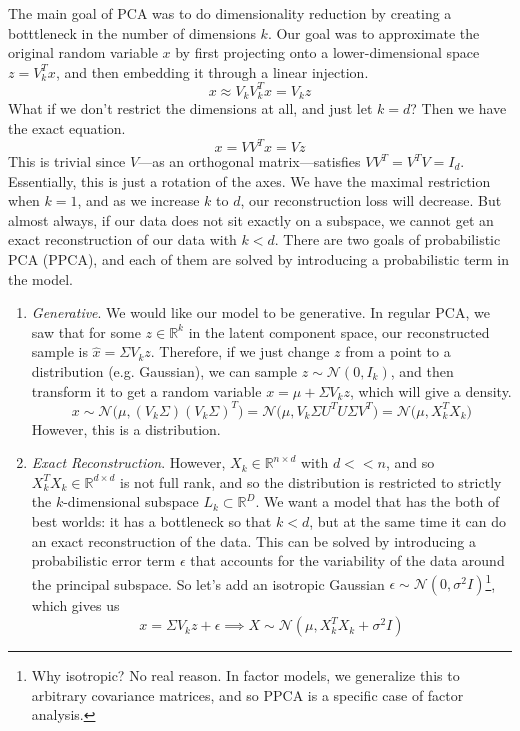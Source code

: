   The main goal of PCA was to do dimensionality reduction by creating a botttleneck in the number of dimensions $k$. Our goal was to approximate the original random variable $x$ by first projecting onto a lower-dimensional space $z = V_k^T x$, and then embedding it through a linear injection. 
  \begin{equation}
    x \approx V_k V_k^T x = V_k z 
  \end{equation} 
  What if we don't restrict the dimensions at all, and just let $k = d$? Then we have the exact equation. 
  \begin{equation}
    x = V V^T x = V z
  \end{equation}
  This is trivial since $V$---as an orthogonal matrix---satisfies $V V^T = V^T V = I_d$. Essentially, this is just a rotation of the axes. We have the maximal restriction when $k = 1$, and as we increase  $k$ to $d$, our reconstruction loss will decrease. But almost always, if our data does not sit exactly on a subspace, we cannot get an exact reconstruction of our data with $k < d$. There are two goals of probabilistic PCA (PPCA), and each of them are solved by introducing a probabilistic term in the model. \cite{1999tipping} 
  \begin{enumerate}
    \item \textit{Generative}. We would like our model to be generative. In regular PCA, we saw that for some $z \in \mathbb{R}^k$ in the latent component space, our reconstructed sample is $\hat{x} = \Sigma V_k z$. Therefore, if we just change $z$ from a point to a distribution (e.g. Gaussian), we can sample $z \sim \mathcal{N}(0, I_k)$, and then transform it to get a random variable $x = \mu + \Sigma V_k z$, which will give a density. 
    \begin{equation}
      x \sim \mathcal{N} \big( \mu, (V_k \Sigma)(V_k \Sigma)^T \big) = \mathcal{N} \big( \mu, V_k \Sigma U^T U \Sigma V^T \big) = \mathcal{N} \big( \mu, X_k^T X_k)
    \end{equation} 
    However, this is a distribution. 

    \item \textit{Exact Reconstruction}. However, $X_k \in \mathbb{R}^{n \times d}$ with $d << n$, and so $X_k^T X_k \in \mathbb{R}^{d \times d}$ is not full rank, and so the distribution is restricted to strictly the $k$-dimensional subspace $L_k \subset \mathbb{R}^D$. We want a model that has the both of best worlds: it has a bottleneck so that $k < d$, but at the same time it can do an exact reconstruction of the data. This can be solved by introducing a probabilistic error term $\epsilon$ that accounts for the variability of the data around the principal subspace. So let's add an isotropic Gaussian $\epsilon \sim \mathcal{N}(0, \sigma^2 I)$\footnote{Why isotropic? No real reason. In factor models, we generalize this to arbitrary covariance matrices, and so PPCA is a specific case of factor analysis.}, which gives us 
    \begin{equation}
      x = \Sigma V_k z + \epsilon \implies X \sim \mathcal{N}(\mu, X_k^T X_k + \sigma^2 I)
    \end{equation} 
  \end{enumerate} 

